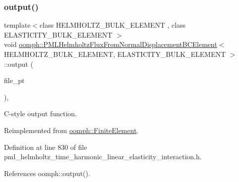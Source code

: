 \subsubsection{\texorpdfstring{output()}{output()}\hspace{0.1cm}{\footnotesize\ttfamily [3/4]}}
{\footnotesize\ttfamily template$<$class H\+E\+L\+M\+H\+O\+L\+T\+Z\+\_\+\+B\+U\+L\+K\+\_\+\+E\+L\+E\+M\+E\+NT , class E\+L\+A\+S\+T\+I\+C\+I\+T\+Y\+\_\+\+B\+U\+L\+K\+\_\+\+E\+L\+E\+M\+E\+NT $>$ \\
void \hyperlink{classoomph_1_1PMLHelmholtzFluxFromNormalDisplacementBCElement}{oomph\+::\+P\+M\+L\+Helmholtz\+Flux\+From\+Normal\+Displacement\+B\+C\+Element}$<$ H\+E\+L\+M\+H\+O\+L\+T\+Z\+\_\+\+B\+U\+L\+K\+\_\+\+E\+L\+E\+M\+E\+NT, E\+L\+A\+S\+T\+I\+C\+I\+T\+Y\+\_\+\+B\+U\+L\+K\+\_\+\+E\+L\+E\+M\+E\+NT $>$\+::output (\begin{DoxyParamCaption}\item[{F\+I\+LE $\ast$}]{file\+\_\+pt }\end{DoxyParamCaption})\hspace{0.3cm}{\ttfamily [inline]}, {\ttfamily [virtual]}}



C-\/style output function. 



Reimplemented from \hyperlink{classoomph_1_1FiniteElement_a72cddd09f8ddbee1a20a1ff404c6943e}{oomph\+::\+Finite\+Element}.



Definition at line 830 of file pml\+\_\+helmholtz\+\_\+time\+\_\+harmonic\+\_\+linear\+\_\+elasticity\+\_\+interaction.\+h.



References oomph\+::output().

\mbox{\label{classoomph_1_1PMLHelmholtzFluxFromNormalDisplacementBCElement_a798feeb0c2f831476e3ded0a91c6a572}} 
